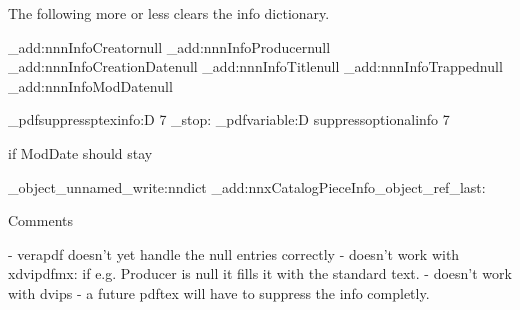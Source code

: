 The following more or less clears the info dictionary.

\pdfmanagement_add:nnn{Info}{Creator}{null}
\pdfmanagement_add:nnn{Info}{Producer}{null}
\pdfmanagement_add:nnn{Info}{CreationDate}{null}
\pdfmanagement_add:nnn{Info}{Title}{null}
\pdfmanagement_add:nnn{Info}{Trapped}{null}
\pdfmanagement_add:nnn{Info}{ModDate}{null}

\tex_pdfsuppressptexinfo:D 7 \scan_stop: %
\tex_pdfvariable:D suppressoptionalinfo 7\relax %

if ModDate should stay

\pdf_object_unnamed_write:nn{dict}{}
\pdfmanagement_add:nnx{Catalog}{PieceInfo}{\pdf_object_ref_last:}


Comments

- verapdf doesn't yet handle the null entries correctly 
- doesn't work with xdvipdfmx: if e.g. Producer is null it fills it with the standard text.
- doesn't work with dvips
- a future pdftex will have  \pdfomitinfodict to suppress the info completly.


